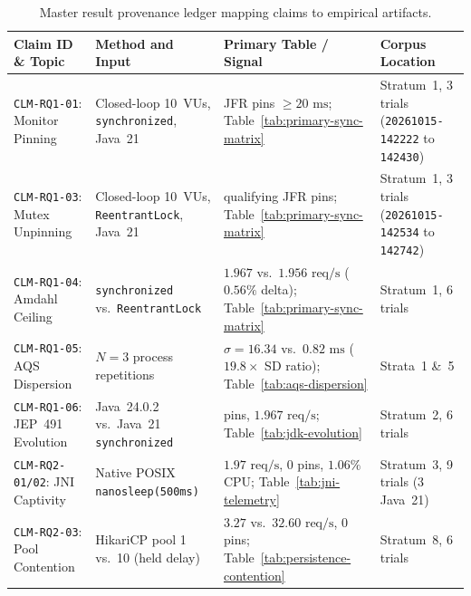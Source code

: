 \begin{table}[htbp]
  \centering
  \small
  \caption{Master result provenance ledger mapping claims to empirical artifacts.}
  \label{tab:result-provenance}
  \begin{tabularx}{\textwidth}{@{}>{\raggedright\arraybackslash}p{}>{\raggedright\arraybackslash}p{}>{\raggedright\arraybackslash}p{}>{\raggedright\arraybackslash}X@{}}
    \toprule
    \textbf{Claim ID \& Topic} & \textbf{Method and Input} & \textbf{Primary Table / Signal} & \textbf{Corpus Location} \\
    \midrule
    \texttt{CLM-RQ1-01}: Monitor Pinning & Closed-loop 10~VUs, \texttt{synchronized}, Java~21 & 108 JFR pins $\ge 20\text{ ms}$; Table~\ref{tab:primary-sync-matrix} & Stratum~1, 3 trials (\texttt{20261015-142222} to \texttt{142430}) \\
    \addlinespace
    \texttt{CLM-RQ1-03}: Mutex Unpinning & Closed-loop 10~VUs, \texttt{ReentrantLock}, Java~21 & 0 qualifying JFR pins; Table~\ref{tab:primary-sync-matrix} & Stratum~1, 3 trials (\texttt{20261015-142534} to \texttt{142742}) \\
    \addlinespace
    \texttt{CLM-RQ1-04}: Amdahl Ceiling & \texttt{synchronized} vs.\ \texttt{ReentrantLock} & $1.967$ vs.\ $1.956\text{ req/s}$ ($0.56\%$ delta); Table~\ref{tab:primary-sync-matrix} & Stratum~1, 6 trials \\
    \addlinespace
    \texttt{CLM-RQ1-05}: AQS Dispersion & $N=3$ process repetitions & $\sigma = 16.34$ vs.\ $0.82\text{ ms}$ ($19.8\times$ SD ratio); Table~\ref{tab:aqs-dispersion} & Strata~1 \&~5 \\
    \addlinespace
    \texttt{CLM-RQ1-06}: JEP~491 Evolution & Java~24.0.2 vs.\ Java~21 \texttt{synchronized} & 0 pins, $1.967\text{ req/s}$; Table~\ref{tab:jdk-evolution} & Stratum~2, 6 trials \\
    \addlinespace
    \texttt{CLM-RQ2-01/02}: JNI Captivity & Native POSIX \texttt{nanosleep(500ms)} & $1.97\text{ req/s}$, 0 pins, $1.06\%$ CPU; Table~\ref{tab:jni-telemetry} & Stratum~3, 9 trials (3 Java~21) \\
    \addlinespace
    \texttt{CLM-RQ2-03}: Pool Contention & HikariCP pool 1 vs.\ 10 (held delay) & $3.27$ vs.\ $32.60\text{ req/s}$, 0 pins; Table~\ref{tab:persistence-contention} & Stratum~8, 6 trials \\
    \bottomrule
  \end{tabularx}
\end{table}

